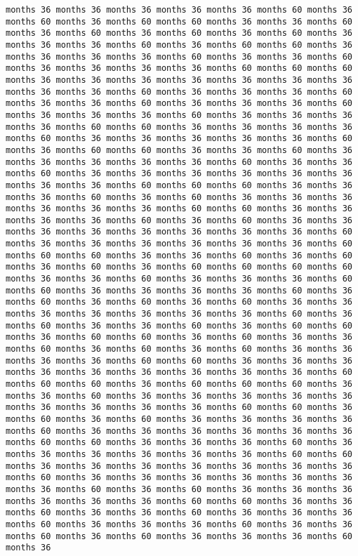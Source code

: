 \documentclass[11pt]{article}
\begin{document}
\begin{Verbatim}[commandchars=\\\{\}, frame=single, framerule=2mm, rulecolor=\color{outerrorbackground}]
months 36 months 36 months 36 months 36 months 36 months 60 months 36 months 60 months 36 months 60 months 60 months 36 months 36 months 60 months 36 months 60 months 36 months 60 months 36 months 60 months 36 months 36 months 36 months 60 months 36 months 60 months 60 months 36 months 36 months 36 months 36 months 60 months 36 months 36 months 60 months 36 months 36 months 36 months 36 months 60 months 60 months 60 months 36 months 36 months 36 months 36 months 36 months 36 months 36 months 36 months 36 months 60 months 36 months 36 months 36 months 60 months 36 months 36 months 60 months 36 months 36 months 36 months 60 months 36 months 36 months 36 months 60 months 36 months 36 months 36 months 36 months 60 months 60 months 36 months 36 months 36 months 36 months 60 months 36 months 36 months 36 months 36 months 36 months 60 months 36 months 60 months 60 months 36 months 36 months 60 months 36 months 36 months 36 months 36 months 36 months 60 months 36 months 36 months 60 months 36 months 36 months 36 months 36 months 36 months 36 months 36 months 36 months 60 months 60 months 60 months 36 months 36 months 36 months 60 months 36 months 60 months 36 months 36 months 36 months 36 months 36 months 36 months 60 months 60 months 36 months 36 months 36 months 36 months 60 months 36 months 60 months 36 months 36 months 36 months 36 months 36 months 36 months 36 months 36 months 60 months 36 months 36 months 36 months 36 months 36 months 36 months 60 months 60 months 60 months 36 months 36 months 60 months 36 months 60 months 36 months 60 months 36 months 60 months 60 months 60 months 60 months 36 months 36 months 60 months 36 months 36 months 36 months 60 months 60 months 36 months 36 months 36 months 36 months 60 months 36 months 60 months 36 months 60 months 36 months 60 months 36 months 36 months 36 months 36 months 36 months 36 months 36 months 60 months 36 months 60 months 36 months 36 months 60 months 36 months 60 months 60 months 36 months 60 months 60 months 36 months 60 months 36 months 36 months 60 months 36 months 60 months 36 months 60 months 36 months 36 months 36 months 36 months 60 months 60 months 36 months 36 months 36 months 36 months 36 months 36 months 36 months 36 months 36 months 60 months 60 months 60 months 36 months 60 months 60 months 60 months 36 months 36 months 60 months 36 months 36 months 36 months 36 months 36 months 36 months 36 months 36 months 36 months 60 months 60 months 36 months 60 months 36 months 60 months 36 months 36 months 36 months 36 months 60 months 36 months 36 months 36 months 36 months 36 months 36 months 60 months 60 months 36 months 36 months 36 months 60 months 36 months 36 months 36 months 36 months 36 months 36 months 60 months 60 months 36 months 36 months 36 months 36 months 36 months 36 months 36 months 60 months 36 months 36 months 36 months 36 months 36 months 36 months 36 months 60 months 36 months 60 months 36 months 36 months 36 months 36 months 36 months 36 months 60 months 60 months 36 months 36 months 60 months 36 months 36 months 60 months 36 months 36 months 36 months 60 months 36 months 36 months 36 months 60 months 36 months 36 months 60 months 36 months 60 months 36 months 36 months 36 months 60 months 36 
\end{Verbatim}
\end{document}
